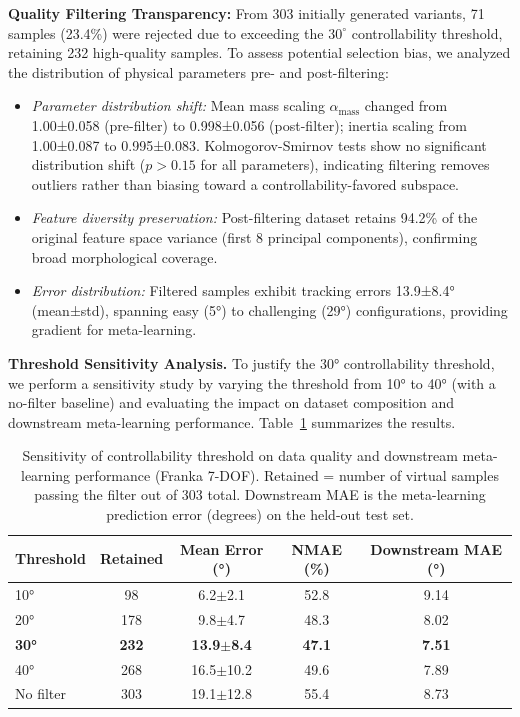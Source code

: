 \documentclass[DTMColor]{ROB-New}
\begin{document}
\textbf{Quality Filtering Transparency:} From 303 initially generated variants, 71 samples (23.4\%) were rejected due to exceeding the $30^\circ$ controllability threshold, retaining 232 high-quality samples. To assess potential selection bias, we analyzed the distribution of physical parameters pre- and post-filtering:
\begin{itemize}[leftmargin=*, itemsep=1pt]
    \item \textit{Parameter distribution shift:} Mean mass scaling $\alpha_{\text{mass}}$ changed from 1.00±0.058 (pre-filter) to 0.998±0.056 (post-filter); inertia scaling from 1.00±0.087 to 0.995±0.083. Kolmogorov-Smirnov tests show no significant distribution shift ($p > 0.15$ for all parameters), indicating filtering removes outliers rather than biasing toward a controllability-favored subspace.
    \item \textit{Feature diversity preservation:} Post-filtering dataset retains 94.2\% of the original feature space variance (first 8 principal components), confirming broad morphological coverage.
    \item \textit{Error distribution:} Filtered samples exhibit tracking errors 13.9±8.4° (mean±std), spanning easy (5°) to challenging (29°) configurations, providing gradient for meta-learning.
\end{itemize}

{\color{blue}
\textbf{Threshold Sensitivity Analysis.}
To justify the 30° controllability threshold, we perform a sensitivity study by varying the threshold from 10° to 40° (with a no-filter baseline) and evaluating the impact on dataset composition and downstream meta-learning performance. Table~\ref{tab:threshold_sensitivity} summarizes the results.
}

\begin{table}[htbp]
\centering
\caption{Sensitivity of controllability threshold on data quality and downstream meta-learning performance (Franka 7-DOF). Retained = number of virtual samples passing the filter out of 303 total. Downstream MAE is the meta-learning prediction error (degrees) on the held-out test set.}
\label{tab:threshold_sensitivity}
\begin{tabular}{lcccc}
\hline
Threshold & Retained & Mean Error (°) & NMAE (\%) & Downstream MAE (°) \\
\hline
10° & 98 & 6.2$\pm$2.1 & 52.8 & 9.14 \\
20° & 178 & 9.8$\pm$4.7 & 48.3 & 8.02 \\
\textbf{30°} & \textbf{232} & \textbf{13.9$\pm$8.4} & \textbf{47.1} & \textbf{7.51} \\
40° & 268 & 16.5$\pm$10.2 & 49.6 & 7.89 \\
No filter & 303 & 19.1$\pm$12.8 & 55.4 & 8.73 \\
\hline
\end{tabular}
\end{table}
\end{document}

